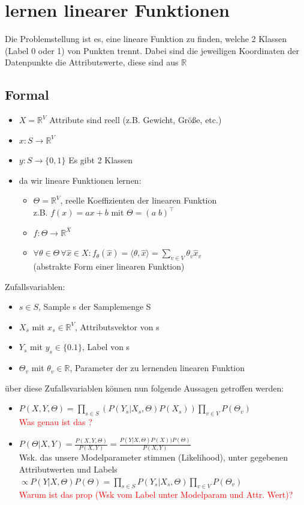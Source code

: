 \documentclass[12pt,a4paper]{article}
\newcommand{\red}[1]{\textcolor{red} {#1}}
\begin{document}
\section{lernen linearer Funktionen}
Die Problemstellung ist es, eine lineare Funktion zu finden, welche 2 Klassen (Label 0 oder 1) von Punkten trennt. Dabei sind die jeweiligen Koordinaten der Datenpunkte die Attributswerte, diese sind aus $\mathbb{R}$
\subsection{Formal}

\begin{itemize}
\item $X=\mathbb{R}^V$ Attribute sind reell (z.B. Gewicht, Größe, etc.)
\item $x:S\rightarrow\mathbb{R}^V$
\item $y:S\rightarrow \{0,1\}$ Es gibt 2 Klassen
\item da wir lineare Funktionen lernen:
\begin{itemize}
\item $\Theta = \mathbb{R}^V$, reelle Koeffizienten der linearen Funktion\\
z.B. $f(x) = ax+b$ mit $\Theta = (a\; b)^\top$
\item $f: \Theta\rightarrow\mathbb{R}^X$
\item $\displaystyle \forall \theta\in\Theta \, \forall \hat{x}\in X: f_\theta(\hat{x}) = \langle \theta, \hat{x} \rangle = \sum_{v\in V} \theta_v \hat{x}_v$\\
(abstrakte Form einer linearen Funktion)
\end{itemize}
\end{itemize}
Zufallsvariablen:
\begin{itemize}
\item $s\in S$, Sample s der Samplemenge S
\item $X_s$ mit $x_s \in \mathbb{R}^V$, Attributsvektor von s
\item $Y_s$ mit $y_s \in  \{0.1\}$, Label von s
\item $\Theta_v$ mit $\theta_v \in \mathbb{R}$, Parameter der zu lernenden linearen Funktion
\end{itemize}
über diese Zufallsvariablen können nun folgende Aussagen getroffen werden:
\begin{itemize}
\item $\displaystyle P(X,Y,\Theta) = \prod_{s\in S} (P(Y_s|X_s, \Theta)P(X_s)) \prod_{v\in V} P(\Theta_v)$\\
\red{Was genau ist das ?}
\item $\displaystyle P(\Theta | X,Y) = \frac{P(X,Y,\Theta)}{P(X,Y)} = \frac{P(Y|X, \Theta)P(X))P(\Theta)}{P(X,Y)}$\\Wsk. das unsere Modelparameter stimmen (Likelihood), unter gegebenen Attributwerten und Labels\\
$\displaystyle \propto P(Y|X,\Theta)P(\Theta) = \prod_{s\in S} P(Y_s|X_s,\Theta)\prod_{v\in V} P(\Theta_v)$\\
\red{Warum ist das prop (Wsk vom Label unter Modelparam und Attr. Wert)?}
\end{itemize}
\end{document}
